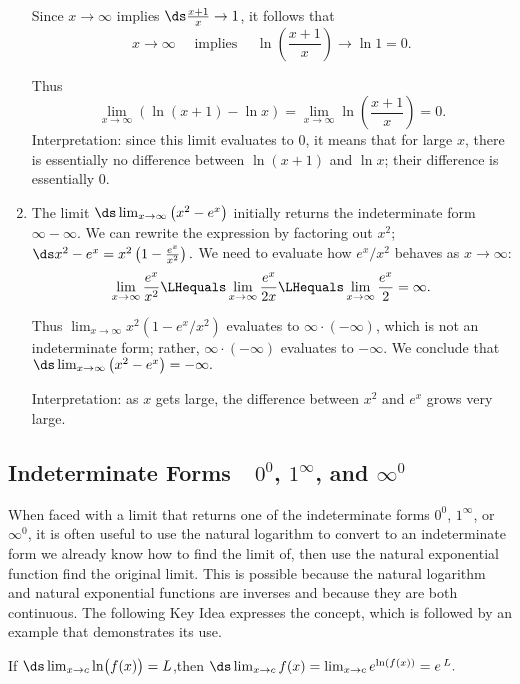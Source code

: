 \begin{example}
\begin{enumerate}
Since $x\to\infty$ implies $\ds\frac{x+1}x\to 1$, it follows that 
\[x\to\infty \quad \text{ implies }\quad \ln\left(\frac{x+1}x\right)\to\ln 1=0.\]

Thus
\[
 \lim_{x\to\infty} \left(\ln(x+1)-\ln x\right)
 = \lim_{x\to \infty} \ln \left(\frac{x+1}x\right)=0.
\]
Interpretation: since this limit evaluates to 0, it means that for large $x$, there is essentially no difference between $\ln (x+1)$ and $\ln x$; their difference is essentially 0.

	\item	The limit $\ds \lim_{x\to\infty} \left(x^2-e^x\right)$ initially returns the indeterminate form $\infty-\infty$. We can rewrite the expression by factoring out $x^2$; $\ds x^2-e^x = x^2\left(1-\frac{e^x}{x^2}\right).$ We need to evaluate how $e^x/x^2$ behaves as $x\to\infty$:
\[
\lim_{x\to\infty}\frac{e^x}{x^2} \LHequals \lim_{x\to\infty} \frac{e^x}{2x}
\LHequals \lim_{x\to\infty} \frac{e^x}{2} = \infty.
\]

Thus $\lim_{x\to\infty}x^2(1-e^x/x^2)$ evaluates to $\infty\cdot(-\infty)$, which is not an indeterminate form; rather, $\infty\cdot(-\infty)$ evaluates to $-\infty$. We conclude that 
$\ds \lim_{x\to\infty} \left(x^2-e^x\right) = -\infty.$

Interpretation: as $x$ gets large, the difference between $x^2$ and $e^x$ grows very large.
\end{enumerate}
\end{example}

\subsection{Indeterminate Forms\ \ \texorpdfstring{$0^0$, $1^\infty$, and $\infty^0$}{0\^{}0, 1\^{}∞, and ∞\^{}0}}

When faced with a limit that returns one of the indeterminate forms $0^0$, $1^\infty$, or $\infty^0$, it is often useful to use the natural logarithm to convert to an indeterminate form we already know how to find the limit of, then use the natural exponential function find the original limit. This is possible because the natural logarithm and natural exponential functions are inverses and because they are both continuous. The following Key Idea expresses the concept, which is followed by an example that demonstrates its use.

\begin{keyidea}\label{idea:LHR_power}%
If $\ds \lim_{x\to c} \ln\bigl(f(x)\bigr) = L$,\quad then 
$\ds \lim_{x\to c} f(x) = \lim_{x\to c} e^{\ln(f(x))} = e\,^L.$ 
\end{keyidea}

